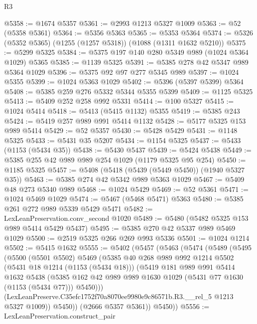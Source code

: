 \begin{lexlean}{R3}
\begin{coremodule}
@5358 := @1674 @5357
@5361 := @2993 @1213 @5327 @1009
@5363 := @52 (@5358 @5361)
@5364 := @5356 @5363
@5365 := @5353 @5364
@5374 := @5326 (@5352 @5365) (@1255 (@1257 @5318)) (@1088 (@1311 @1632 @5210))
@5375 := @5299 @5325
@5384 := @5375 @197 @140 @280 @5349 @989 (@1024 @5364 @1029) @5365
@5385 := @1139 @5325
@5391 := @5385 @278 @42 @5347 @989 @5364 @1029
@5396 := @5375 @92 @97 @277 @5345 @989
@5397 := @1024 @5355
@5399 := @1024 @5363 @1029
@5402 := @5396 (@5397 @5399) @5364
@5408 := @5385 @259 @276 @5332 @5344 @5355 @5399
@5409 := @1125 @5325
@5413 := @5409 @252 @258 @992 @5331
@5414 := @100 @5327
@5415 := @1024 @5414
@5418 := @5413 (@5415 @1132) @5355
@5419 := @5385 @243
@5424 := @5419 @257 @989 @991 @5414 @1132
@5428 := @5177 @5325 @153 @989 @5414
@5429 := @52 @5357
@5430 := @5428 @5429
@5431 := @1148 @5325
@5433 := @5431 @35 @5207
@5434 := @1154 @5325
@5437 := @5433 (@1153 (@5434 @35))
@5438 := @5430 @5437
@5439 := @5424 @5438
@5449 := @5385 @255 @42 @989 @989 @254 @1029 (@1179 @5325 @95 @254)
@5450 := @1185 @5325
@5457 := @5408 (@5418 (@5439 (@5449 @5450)) (@1940 @5327 @35))
@5463 := @5385 @274 @42 @5342 @989 @5363 @1029
@5467 := @5409 @48 @273 @5340 @989
@5468 := @1024 @5429
@5469 := @52 @5361
@5471 := @1024 @5469 @1029
@5474 := @5467 (@5468 @5471) @5363
@5480 := @5385 @261 @272 @989 @5339 @5429 @5471
@5482 := LexLeanPreservation.conv_second @1020
@5489 := @5480 (@5482 @5325 @153 @989 @5414 @5429 @5437)
@5495 := @5385 @270 @42 @5337 @989 @5469 @1029
@5500 := @2519 @5325 @266 @269 @993 @5336
@5501 := @1024 @1214
@5502 := @5415 @1632
@5555 := @5402
    (@5457
      (@5463
        (@5474
          (@5489
            (@5495
              (@5500
                (@5501 @5502)
                @5469
                (@5385
                  @40
                  @268
                  @989
                  @992
                  @1214
                  @5502
                  (@5431 @18 @1214 (@1153 (@5434 @18)))
                  (@5419
                    @181
                    @989
                    @991
                    @5414
                    @1632
                    @5438
                    (@5385
                      @162
                      @42
                      @989
                      @989
                      @1630
                      @1029
                      (@5431 @77 @1630 (@1153 (@5434 @77)))
                      @5450)))
                (LexLeanPreserve.C35efc1752f70a8070ee9980e9c86571b.R3.__rel_5 @1213 @5327 @1009))
              @5450))
          (@2666 @5357 @5361))
        @5450))
@5556 := LexLeanPreservation.construct_pair

\end{coremodule}
\end{lexlean}
